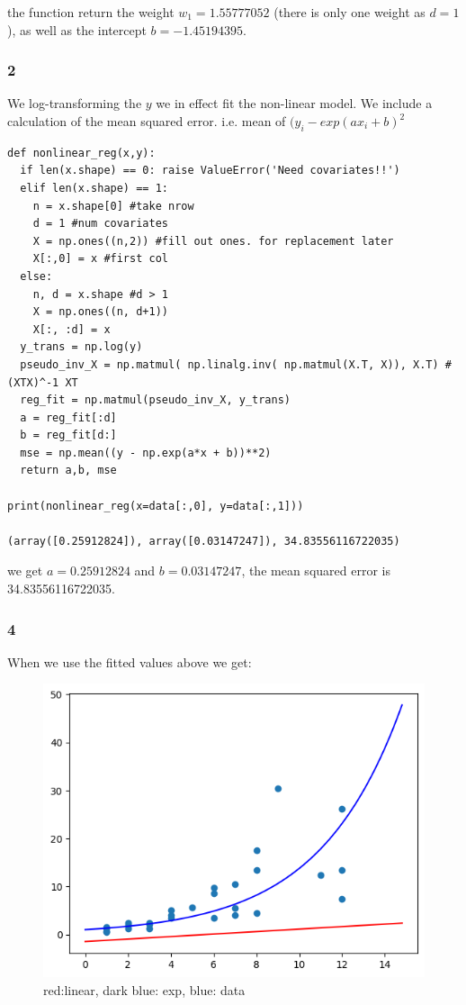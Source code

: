\documentclass[a4paper,12pt]{article}
\begin{document}
the function return the weight $w_1 = 1.55777052$ (there is only one weight as $d=1$), as well as the  
intercept $b = -1.45194395$.


\subsubsection*{2}
We log-transforming the $y$ we in effect fit the non-linear model. 
We include a calculation of the mean squared error. i.e. mean of $(y_i - exp(ax_i+b)^2$


\begin{lstlisting}
def nonlinear_reg(x,y):
  if len(x.shape) == 0: raise ValueError('Need covariates!!')
  elif len(x.shape) == 1:
    n = x.shape[0] #take nrow
    d = 1 #num covariates
    X = np.ones((n,2)) #fill out ones. for replacement later
    X[:,0] = x #first col 
  else:
    n, d = x.shape #d > 1
    X = np.ones((n, d+1))
    X[:, :d] = x
  y_trans = np.log(y)
  pseudo_inv_X = np.matmul( np.linalg.inv( np.matmul(X.T, X)), X.T) #(XTX)^-1 XT
  reg_fit = np.matmul(pseudo_inv_X, y_trans)
  a = reg_fit[:d]
  b = reg_fit[d:]
  mse = np.mean((y - np.exp(a*x + b))**2)
  return a,b, mse

print(nonlinear_reg(x=data[:,0], y=data[:,1]))

(array([0.25912824]), array([0.03147247]), 34.83556116722035)
\end{lstlisting}

we get $a = 0.25912824$ and $b = 0.03147247$, the mean squared error is 34.83556116722035.


\subsubsection*{4}
When we use the fitted values above we get:
\begin{figure}[htbp]
    \centering
    \includegraphics[width=0.5\linewidth]{reg_4.png}
    \caption{red:linear, dark blue: exp, blue: data} %
    \label{fig:reg_1}
\end{figure}



\end{document}
